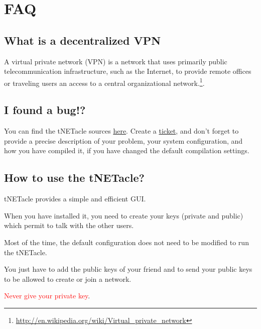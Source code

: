 ﻿\section{FAQ}
\subsection{What is a decentralized VPN}
A virtual private network (VPN) is a network that uses primarily public telecommunication infrastructure, such as the Internet, to provide remote offices or traveling users an access to a central organizational network.\footnote{\url{http://en.wikipedia.org/wiki/Virtual\_private\_network}}.

\subsection{I found a bug!?}

You can find the tNETacle sources \href{https://github.com/LaKabane/tNETacle}{here}.
Create a \href{https://github.com/LaKabane/tNETacle/issues/new}{ticket}, and don't forget to provide a precise description of your problem, your system configuration, and how you have compiled it, if you have changed the default compilation settings.

\subsection{How to use the tNETacle?}
tNETacle provides a simple and efficient GUI.

When you have installed it, you need to create your keys (private and public) which permit to talk with the other users.

Most of the time, the default configuration does not need to be modified to run the tNETacle.

You just have to add the public keys of your friend and to send your public keys to be allowed to create or join a network.

\textcolor{red}{Never give your private key}.
